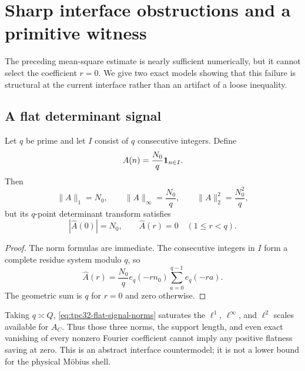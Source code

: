 \section{Sharp interface obstructions and a primitive witness}
\label{sec:tpc32-obstructions}

The preceding mean-square estimate is nearly sufficient numerically, but
it cannot select the coefficient $r=0$.  We give two exact models showing
that this failure is structural at the current interface rather than an
artifact of a loose inequality.

\subsection{A flat determinant signal}

\begin{proposition}
\label{prop:tpc32-flat-signal}
Let $q$ be prime and let $I$ consist of $q$ consecutive integers.  Define
\begin{equation}
 A(n)=\frac{N_0}{q}\mathbf 1_{n\in I}.
 \label{eq:tpc32-flat-signal}
\end{equation}
Then
\begin{equation}
 \|A\|_1=N_0,
 \qquad
 \|A\|_\infty=\frac{N_0}{q},
 \qquad
 \|A\|_2^2=\frac{N_0^2}{q},
 \label{eq:tpc32-flat-signal-norms}
\end{equation}
but its $q$-point determinant transform satisfies
\begin{equation}
 |\widehat A(0)|=N_0,
 \qquad
 \widehat A(r)=0\quad(1\le r<q).
 \label{eq:tpc32-flat-signal-dft}
\end{equation}
\end{proposition}

\begin{proof}
The norm formulas are immediate.  The consecutive integers in $I$ form a
complete residue system modulo $q$, so
\[
 \widehat A(r)=\frac{N_0}{q}
 e_q(-rn_0)\sum_{a=0}^{q-1}e_q(-ra).
\]
The geometric sum is $q$ for $r=0$ and zero otherwise.
\end{proof}

Taking $q\asymp Q$, \eqref{eq:tpc32-flat-signal-norms} saturates the
$\ell^1$, $\ell^\infty$, and $\ell^2$ scales available for $A_C$.  Thus
those three norms, the support length, and even exact vanishing of every
nonzero Fourier coefficient cannot imply any positive flatness saving at
zero.  This is an abstract interface countermodel; it is not a lower bound
for the physical M\"obius shell.


